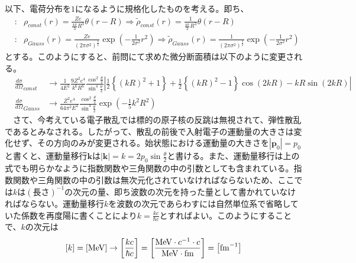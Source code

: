 \documentclass[a4j,fleqn]{jsarticle}
\begin{document}
        \subsection{}
        以下、電荷分布を$1$になるように規格化したものを考える。即ち、
        \begin{eqnarray}
            &\text{}:&\rho_{const}\left(r\right)=\frac{Ze}{\frac{4\pi}{3}R^3}\theta(r-R)\Rightarrow\tilde{\rho}_{const}\left(r\right)=\frac{1}{\frac{4\pi}{3}R^3}\theta(r-R)\\
            &\text{}:&\rho_{Gauss}\left(r\right)=\frac{Ze}{\left(2\pi\sigma^2\right)^{\frac{3}{2}}}\exp{\left(-\frac{1}{2\sigma^2}r^2\right)}\Rightarrow\tilde{\rho}_{Gauss}\left(r\right)=\frac{1}{\left(2\pi\sigma^2\right)^{\frac{3}{2}}}\exp{\left(-\frac{1}{2\sigma^2}r^2\right)}
        \end{eqnarray}
        とする。このようにすると、前問にて求めた微分断面積は以下のように変更される。
        \begin{eqnarray}
            &\frac{d\sigma}{d\Omega}_{const}&\to\frac{1}{4E^2}\frac{9Z^2e^4}{k^6R^6}\frac{\cos^2{\frac{\theta}{2}}}{\sin^4{\frac{\theta}{2}}}\left|\frac{1}{2}\left\{\left(kR\right)^2+1\right\}+\frac{1}{2}\left\{\left(kR\right)^2-1\right\}\cos{\left(2kR\right)}-{kR}\sin{\left(2kR\right)}\right|\\
            &\frac{d\sigma}{d\Omega}_{Gauss}&\to\frac{Z^2e^4}{64\pi^2E^2}\frac{\cos^2{\frac{\theta}{2}}}{\sin^4{\frac{\theta}{2}}}\exp{\left(-\frac{1}{5}k^2R^2\right)}
        \end{eqnarray}
        　さて、今考えている電子散乱では標的の原子核の反跳は無視されて、弾性散乱であるとみなされる。したがって、散乱の前後で入射電子の運動量の大きさは変化せず、その方向のみが変更される。始状態における運動量の大きさを$|\bm{p}_0|=p_0$と書くと、運動量移行$\bm{k}$は$|\bm{k}|=k=2p_0\sin{\frac{\theta}{2}}$と書ける。また、運動量移行は上の式でも明らかなように指数関数や三角関数の中の引数としても含まれている。指数関数や三角関数の中の引数は無次元化されていなければならないため、ここでは$k$は$\left(\text{長さ}\right)^{-1}$の次元の量、即ち波数の次元を持った量として書かれていなければならない。運動量移行$k$を波数の次元であらわすには自然単位系で省略していた係数を再度陽に書くことにより$k=\frac{kc}{{\hbar}c}$とすればよい。このようにすることで、$k$の次元は
        \begin{eqnarray}
            \left[k\right]=\left[{\rm{MeV}}\right]\to\left[\frac{kc}{{\hbar}c}\right]=\left[\frac{{\rm{MeV}}\cdot{c^{-1}}\cdot{c}}{\rm{MeV\cdot{fm}}}\right]=\left[{\rm{fm}}^{-1}\right]
        \end{eqnarray}
\end{document}
